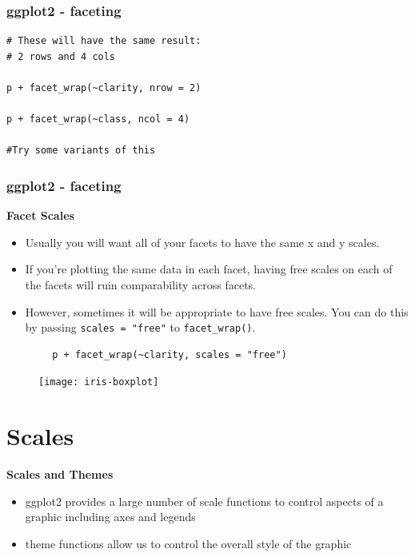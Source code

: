 \documentclass{beamer}
\begin{document}
\begin{frame}[fragile]
\frametitle{ggplot2 - faceting}
\begin{framed}
\begin{verbatim}
# These will have the same result: 
# 2 rows and 4 cols

p + facet_wrap(~clarity, nrow = 2)

p + facet_wrap(~class, ncol = 4)

#Try some variants of this 
\end{verbatim}
\end{framed}
\end{frame}
\begin{frame}[fragile]
	\frametitle{ggplot2 - faceting}
	\large
\noindent \textbf{Facet Scales}
	\begin{itemize}
\item	Usually you will want all of your facets to have the same x and y scales.
\item  If you're plotting the same data in each facet, having free scales on each of the facets will ruin comparability across facets.
\item However, sometimes it will be appropriate to have free scales. You can do this by passing \texttt{scales = "free"} to \texttt{facet\_wrap()}.
	\end{itemize}

	\begin{framed}
		\begin{verbatim}
		p + facet_wrap(~clarity, scales = "free")
		\end{verbatim}
	\end{framed}
\end{frame}




\begin{frame}
	\begin{figure}
		\centering
		\texttt{[image: iris-boxplot]}
	\end{figure}
	
\end{frame}

\section*{Scales}
\begin{frame}
	\Large
	\vspace{-0.7cm}
\noindent \textbf{Scales and Themes}
	\begin{itemize}
	\item ggplot2 provides a large number of scale functions
	to control aspects of a graphic including axes and
	legends
	\item theme functions allow us to control the overall style
	of the graphic
	\end{itemize}

\end{frame}
\end{document}
